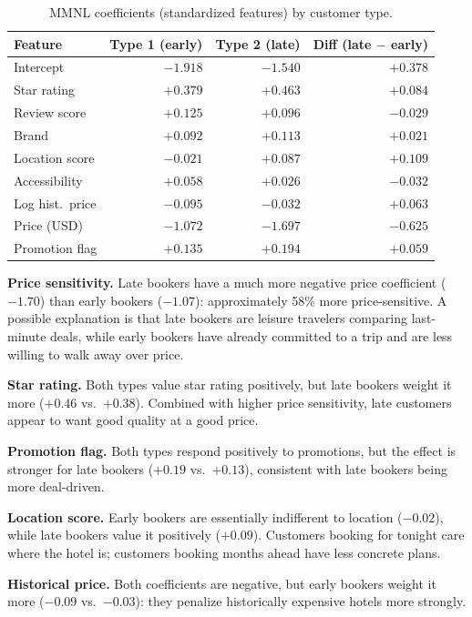 \documentclass[11pt]{article}
\begin{document}
\begin{table}[h]
\centering
\begin{tabular}{lrrr}
\toprule
Feature & Type 1 (early) & Type 2 (late) & Diff (late $-$ early) \\
\midrule
Intercept            & $-1.918$ & $-1.540$ & $+0.378$ \\
Star rating          & $+0.379$ & $+0.463$ & $+0.084$ \\
Review score         & $+0.125$ & $+0.096$ & $-0.029$ \\
Brand                & $+0.092$ & $+0.113$ & $+0.021$ \\
Location score       & $-0.021$ & $+0.087$ & $+0.109$ \\
Accessibility        & $+0.058$ & $+0.026$ & $-0.032$ \\
Log hist.\ price     & $-0.095$ & $-0.032$ & $+0.063$ \\
Price (USD)          & $-1.072$ & $-1.697$ & $-0.625$ \\
Promotion flag       & $+0.135$ & $+0.194$ & $+0.059$ \\
\bottomrule
\end{tabular}
\caption{MMNL coefficients (standardized features) by customer type.}
\end{table}

\textbf{Price sensitivity.} Late bookers have a much more negative price coefficient ($-1.70$) than early bookers ($-1.07$): approximately 58\% more price-sensitive. A possible explanation is that late bookers are leisure travelers comparing last-minute deals, while early bookers have already committed to a trip and are less willing to walk away over price.

\textbf{Star rating.} Both types value star rating positively, but late bookers weight it more ($+0.46$ vs.\ $+0.38$). Combined with higher price sensitivity, late customers appear to want good quality at a good price.

\textbf{Promotion flag.} Both types respond positively to promotions, but the effect is stronger for late bookers ($+0.19$ vs.\ $+0.13$), consistent with late bookers being more deal-driven.

\textbf{Location score.} Early bookers are essentially indifferent to location ($-0.02$), while late bookers value it positively ($+0.09$). Customers booking for tonight care where the hotel is; customers booking months ahead have less concrete plans.

\textbf{Historical price.} Both coefficients are negative, but early bookers weight it more ($-0.09$ vs.\ $-0.03$): they penalize historically expensive hotels more strongly.
\end{document}
